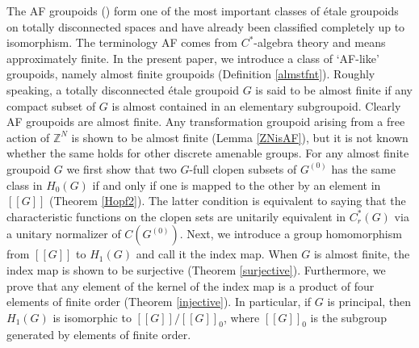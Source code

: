 \documentclass[11pt]{article}
\theoremstyle{definition}
\newcommand{\Z}{\mathbb{Z}}
\begin{document}
The AF groupoids (\cite{R1,Kr,GPS3}) form 
one of the most important classes of 
\'etale groupoids on totally disconnected spaces and 
have already been classified completely up to isomorphism. 
The terminology AF comes from $C^*$-algebra theory and 
means approximately finite. 
In the present paper, 
we introduce a class of `AF-like' groupoids, 
namely almost finite groupoids (Definition \ref{almstfnt}). 
Roughly speaking, 
a totally disconnected \'etale groupoid $G$ is said to be almost finite 
if any compact subset of $G$ is almost contained in an elementary subgroupoid. 
Clearly AF groupoids are almost finite. 
Any transformation groupoid arising from a free action of $\Z^N$ is 
shown to be almost finite (Lemma \ref{ZNisAF}), 
but it is not known whether the same holds for other discrete amenable groups. 
For any almost finite groupoid $G$ we first show that 
two $G$-full clopen subsets of $G^{(0)}$ has the same class in $H_0(G)$ 
if and only if one is mapped to the other by an element in $[[G]]$ 
(Theorem \ref{Hopf2}). 
The latter condition is equivalent to saying that 
the characteristic functions on the clopen sets are unitarily equivalent 
in $C^*_r(G)$ via a unitary normalizer of $C(G^{(0)})$. 
Next, we introduce a group homomorphism from $[[G]]$ to $H_1(G)$ 
and call it the index map. 
When $G$ is almost finite, 
the index map is shown to be surjective (Theorem \ref{surjective}). 
Furthermore, we prove that 
any element of the kernel of the index map is 
a product of four elements of finite order (Theorem \ref{injective}). 
In particular, if $G$ is principal, then 
$H_1(G)$ is isomorphic to $[[G]]/[[G]]_0$, 
where $[[G]]_0$ is the subgroup generated by elements of finite order. 
\end{document}

